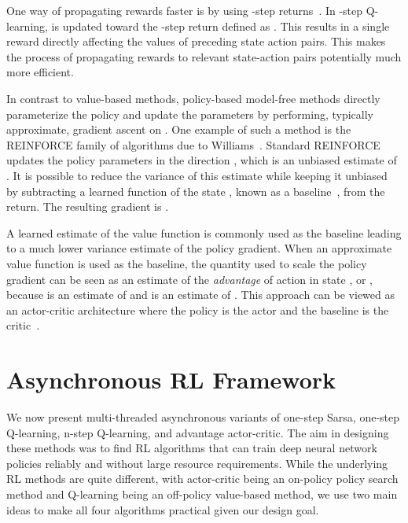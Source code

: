 \documentclass{article} \usepackage{times}
\begin{document}
One way of propagating rewards faster is by using -step returns~\citep{watkins1989learning,peng1996msq}. In -step Q-learning,  is updated toward the -step return defined as
.
This results in a single reward  directly affecting the values of  preceding state action pairs.
This makes the process of propagating rewards to relevant state-action pairs potentially much more efficient.



In contrast to value-based methods, policy-based model-free methods directly parameterize the policy  and update the parameters  by performing, typically approximate, gradient ascent on .
One example of such a method is the REINFORCE family of algorithms due to Williams~.
Standard REINFORCE updates the policy parameters  in the direction , which is an unbiased estimate of .
It is possible to reduce the variance of this estimate while keeping it unbiased by subtracting a learned function of the state , known as a baseline~\citep{Williams1992}, from the return.
The resulting gradient is
.


A learned estimate of the value function is commonly used as the baseline  leading to a much lower variance estimate of the policy gradient.
When an approximate value function is used as the baseline, the quantity  used to scale the policy gradient can be seen as an estimate of the \emph{advantage} of action  in state , or , because  is an estimate of  and  is an estimate of .
This approach can be viewed as an actor-critic architecture where the policy  is the actor and the baseline  is the critic~\citep{sutton:book,degris2012model}.







 \vspace{-0.1cm}
\section{Asynchronous RL Framework}
\label{sec:method}



We now present multi-threaded asynchronous variants of one-step Sarsa, one-step Q-learning, n-step Q-learning, and advantage actor-critic.
The aim in designing these methods was to find RL algorithms that can train deep neural network policies reliably and without large resource requirements.
While the underlying RL methods are quite different, with actor-critic being an on-policy policy search method and Q-learning being an off-policy value-based method, we use two main ideas to make all four algorithms practical given our design goal.
\end{document}
